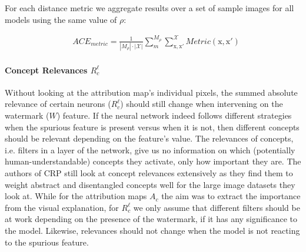 For each distance metric we aggregate results over a set of sample images for all models using the same value of $\rho$:

\begin{align}\label{eq:ace_metric}
& ACE_{metric} = \frac{1}{|M_\rho|\cdot |\mathcal{X}| }\sum_{m}^{M_{\rho}} \sum_{\mathrm{x,x'}}^{\mathcal{X}} Metric(\mathrm{x,x'})
\end{align}

\paragraph{Concept Relevances $R_c^{\ell}$}
Without looking at the attribution map's individual pixels, the summed absolute relevance of certain neurons ($R_c^{\ell}$) should still change when intervening on the watermark ($W$) feature. If the neural network indeed follows different strategies when the spurious feature is present versus when it is not, then different concepts should be relevant depending on the feature's value. 
The relevances of concepts, i.e. filters in a layer of the network, give us no information on which (potentially human-understandable) concepts they activate, only how important they are. The authors of CRP still look at concept relevances extensively as they find them to weight abstract and disentangled concepts well for the large image datasets they look at. While for the attribution maps $A_c$ the aim was to extract the importance from the visual explanation, for $R_c^{\ell}$ we only assume that different filters should be at work depending on the presence of the watermark, if it has any significance to the model. Likewise, relevances should not change when the model is not reacting to the spurious feature. 

